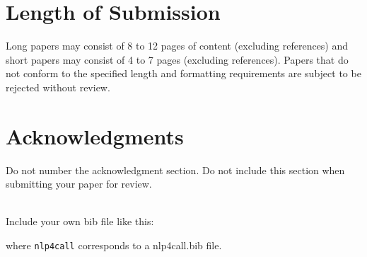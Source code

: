 \documentclass[11pt]{article}
\begin{document}
\section{Length of Submission}
\label{sec:length}

Long papers may consist of 8 to 12 pages of content (excluding
references) and short papers may consist of 4 to 
7 pages (excluding references).  Papers that do not conform to the
specified length and formatting requirements are subject to be
rejected without review.

\section*{Acknowledgments}

Do not number the acknowledgment section. Do not include this section
when submitting your paper for review.

 \\
Include your own bib file like this:
\verb||
\verb|| 

where \verb|nlp4call| corresponds to a nlp4call.bib file.





\end{document}
